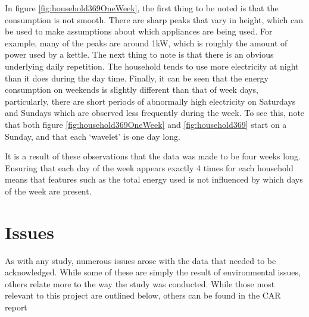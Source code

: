 In figure \ref{fig:household369OneWeek}, the first thing to be noted is that the consumption is not smooth. There are sharp peaks that vary in height, which can be used to make assumptions about which appliances are being used. For example, many of the peaks  are around 1kW, which is roughly the amount of power used by a kettle. The next thing to note is that there is an obvious underlying daily repetition. The household tends to use more electricity at night than it does during the day time. Finally, it can be seen that the energy consumption on weekends is slightly different than that of week days, particularly, there are short periods of abnormally high electricity on Saturdays and Sundays which are observed less frequently during the week. To see this, note that both figure \ref{fig:household369OneWeek} and \ref{fig:household369} start on a Sunday, and that each `wavelet' is one day long.

It is a result of these observations that the data was made to be four weeks long. Ensuring that each day of the week appears exactly 4 times for each household means that features such as the total energy used is not influenced by which days of the week are present.

\householdOneWeek
\householdPlot




\section{Issues}

As with any study, numerous issues arose with the data that needed to be acknowledged. While some of these are simply the result of environmental issues, others relate more to the way the study was conducted. While those most relevant to this project are outlined below, others can be found in the CAR report \cite{early_findings}

